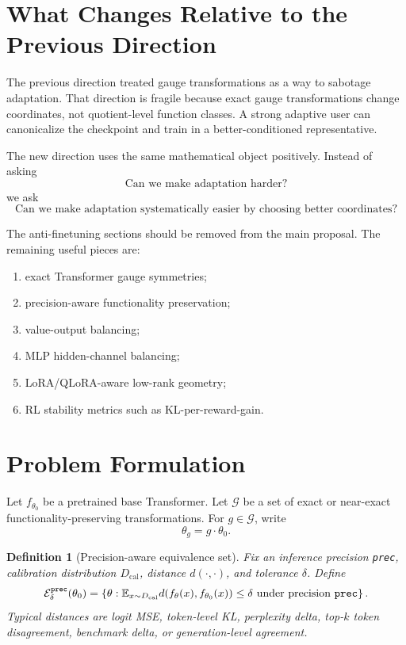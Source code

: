 \documentclass[11pt]{article}
\newcommand{\E}{\mathbb{E}}
\newcommand{\calE}{\mathcal{E}}
\newcommand{\calG}{\mathcal{G}}
\newcommand{\thetazero}{\theta_0}
\newcommand{\thetaft}{\theta_g}
\newtheorem{definition}{Definition}
\begin{document}
\section{What Changes Relative to the Previous Direction}

The previous direction treated gauge transformations as a way to sabotage adaptation. That direction is fragile because exact gauge transformations change coordinates, not quotient-level function classes. A strong adaptive user can canonicalize the checkpoint and train in a better-conditioned representative.

The new direction uses the same mathematical object positively. Instead of asking
\[
    \text{Can we make adaptation harder?}
\]
we ask
\[
    \text{Can we make adaptation systematically easier by choosing better coordinates?}
\]

The anti-finetuning sections should be removed from the main proposal. The remaining useful pieces are:
\begin{enumerate}[leftmargin=*]
    \item exact Transformer gauge symmetries;
    \item precision-aware functionality preservation;
    \item value-output balancing;
    \item MLP hidden-channel balancing;
    \item LoRA/QLoRA-aware low-rank geometry;
    \item RL stability metrics such as KL-per-reward-gain.
\end{enumerate}

\section{Problem Formulation}

Let $f_{\thetazero}$ be a pretrained base Transformer. Let $\calG$ be a set of exact or near-exact functionality-preserving transformations. For $g\in\calG$, write
\[
    \thetaft = g\cdot \thetazero.
\]

\begin{definition}[Precision-aware equivalence set]
Fix an inference precision \texttt{prec}, calibration distribution $D_{\mathrm{cal}}$, distance $d(\cdot,\cdot)$, and tolerance $\delta$. Define
\[
    \calE_{\delta}^{\texttt{prec}}(\thetazero)
    =
    \left\{
    \theta:
    \E_{x\sim D_{\mathrm{cal}}}
    d(f_{\theta}(x),f_{\thetazero}(x))
    \le \delta
    \text{ under precision \texttt{prec}}
    \right\}.
\]
Typical distances are logit MSE, token-level KL, perplexity delta, top-$k$ token disagreement, benchmark delta, or generation-level agreement.
\end{definition}
\end{document}
